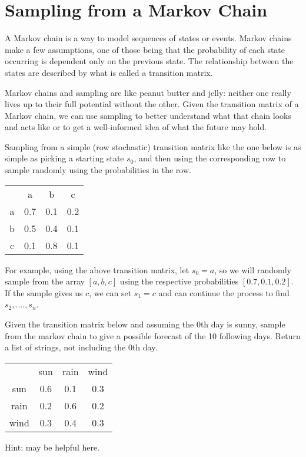 \section*{Sampling from a Markov Chain}
A Markov chain is a way to model sequences of states or events.
Markov chains make a few assumptions, one of those being that the probability of each state occurring is dependent only on the previous state.
The relationship between the states are described by what is called a transition matrix.

Markov chains and sampling are like peanut butter and jelly: neither one really lives up to their full potential without the other. 
Given the transition matrix of a Markov chain, we can use sampling to better understand what that chain looks and acts like or to get a well-informed idea of what the future may hold.

Sampling from a simple (row stochastic) transition matrix like the one below is as simple as picking a starting state $s_0$, and then using the corresponding row to sample randomly using the probabilities in the row. 
\begin{center}
  \begin{tabular}{c c c c}
    & a & b & c\\
    a & 0.7 & 0.1 & 0.2\\
    b & 0.5 & 0.4 & 0.1\\
    c & 0.1 & 0.8 & 0.1
  \end{tabular}
\end{center}
For example, using the above transition matrix, let $s_0=a$, so we will randomly sample from the array $[a,b,c]$ using the respective probabilities $[0.7,0.1,0.2]$.
If the sample gives us $c$, we can set $s_1=c$ and can continue the process to find $s_2,....,s_n$.

\begin{problem}
Given the transition matrix below and assuming the 0th day is sunny, sample from the markov chain to give a possible forecast of the 10 following days.
Return a list of strings, not including the 0th day.
\begin{center}
  \begin{tabular}{c c c c}
    & sun & rain & wind\\
    sun & 0.6 & 0.1 & 0.3\\
    rain & 0.2 & 0.6 & 0.2\\
    wind & 0.3 & 0.4 & 0.3
  \end{tabular} 
\end{center}
Hint:  may be helpful here.
\end{problem} 

